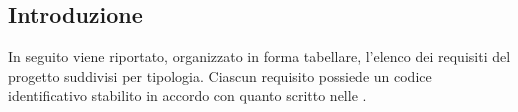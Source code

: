 \newcommand{\refreqID}[2]{\ref{Req#1#2}}

\newcommand{\refreq}[1]{\stepCR\refreqID{#1}{\valueCR}}
\newcommand{\refsreq}[1]{\stepsubCR\refreqID{#1}{\valuesubCR}}

\newcommand{\refUserCase}[1]{
    \foreach [count=\i] \ucref in {#1}{\ifnum\i=1\hyperref[\ucref]{\ucref}\else, \hyperref[\ucref]{\ucref}\fi}
}

\newcommand{\refRequisiti}[2]{
    \foreach [count=\i] \reqID in {#2}{\ifnum\i=1\refreqID{#1}{\reqID}\else, \refreqID{#1}{\reqID}\fi}
}

\newcommand{\row}{\\ \hline}

\subsection{Introduzione}
In seguito viene riportato, organizzato in forma tabellare, l'elenco dei requisiti del progetto suddivisi per tipologia. Ciascun requisito possiede un codice identificativo stabilito in accordo con quanto scritto nelle .


